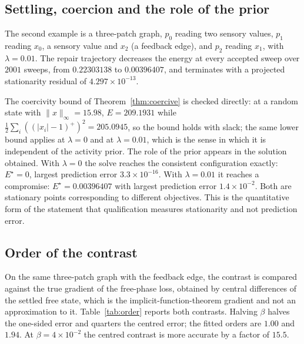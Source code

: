 \documentclass[11pt]{article}
\theoremstyle{definition}
\theoremstyle{remark}
\begin{document}
\subsection{Settling, coercion and the role of the prior}
The second example is a three-patch graph, $p_0$ reading two sensory values, $p_1$ reading $x_0$, a
sensory value and $x_2$ (a feedback edge), and $p_2$ reading $x_1$, with $\lambda=0.01$. The repair
trajectory decreases the energy at every accepted sweep over $2001$ sweeps, from $0.22303138$ to
$0.00396407$, and terminates with a projected stationarity residual of $4.297\times10^{-13}$.

The coercivity bound of Theorem~\ref{thm:coercive} is checked directly: at a random state with
$\|x\|_\infty=15.98$, $E=209.1931$ while $\tfrac12\sum_i((|x_i|-1)^+)^2=205.0945$, so the bound holds
with slack; the same lower bound applies at $\lambda=0$ and at $\lambda=0.01$, which is the sense in
which it is independent of the activity prior. The role of the prior appears in the solution obtained.
With
$\lambda=0$ the solve reaches the consistent configuration exactly: $E^\star=0$, largest prediction
error $3.3\times10^{-16}$. With $\lambda=0.01$ it reaches a compromise: $E^\star=0.00396407$ with
largest prediction error $1.4\times10^{-2}$. Both are stationary points corresponding to different
objectives. This is the quantitative form of the statement that qualification measures stationarity and
not prediction error.

\subsection{Order of the contrast}
On the same three-patch graph with the feedback edge, the contrast is compared against the true
gradient of the free-phase loss, obtained by central differences of the settled free state, which is
the implicit-function-theorem gradient and not an approximation to it. Table~\ref{tab:order} reports
both contrasts. Halving $\beta$ halves the one-sided error and quarters the centred error; the fitted
orders are $1.00$ and $1.94$. At $\beta=4\times10^{-2}$ the centred contrast is more accurate by a
factor of $15.5$.
\end{document}
